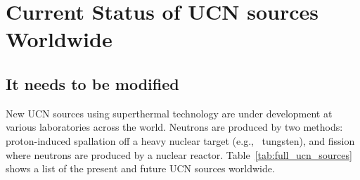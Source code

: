 











\section{Current Status of UCN sources Worldwide}
\subsection {It needs to be modified}
New UCN sources using superthermal technology are under development at
various laboratories across the world.  Neutrons are produced by two
methods: proton-induced spallation off a heavy nuclear target
(e.g., ~tungsten), and fission where neutrons are produced by a nuclear
reactor. Table~\ref{tab:full_ucn_sources}~\cite{Jeff_dnp} shows a
list of the present and future UCN sources worldwide.




